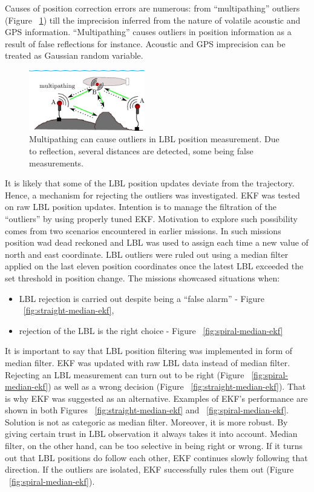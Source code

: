 Causes of position correction errors are numerous: from ``multipathing'' outliers (Figure ~\ref{fig:multipathing}) till the imprecision inferred from the nature of volatile acoustic and GPS information. ``Multipathing'' causes outliers in position information as a result of false reflections for instance. Acoustic and GPS imprecision can be treated as Gaussian random variable. 
\begin{figure}
\vspace{-10pt}
  \centering
    \includegraphics[width=0.45\textwidth]{results/fig/multipathing.eps}
  \caption{Multipathing can cause outliers in LBL position measurement. Due to reflection, several distances are detected, some  being false measurements.}
\label{fig:multipathing}
\end{figure}
It is likely that some of the LBL position updates deviate from the trajectory. Hence, a mechanism for rejecting the outliers was investigated. EKF was tested on raw LBL position updates. Intention is to manage the filtration of the ``outliers'' by using properly tuned EKF. Motivation to explore such possibility comes from two scenarios encountered in earlier missions. In such missions position wad dead reckoned and LBL was used to assign each time a new value of north and east coordinate. LBL outliers were ruled out using a median filter applied on the last eleven position coordinates once the latest LBL exceeded the set threshold in position change. The missions showcased situations when: 
\begin{itemize}
\item LBL rejection is carried out despite being a ``false alarm'' - Figure ~\ref{fig:straight-median-ekf},
\item rejection of the LBL is the right choice - Figure ~\ref{fig:spiral-median-ekf}
\end{itemize}
It is important to say that LBL position filtering was implemented in form of median filter. EKF was updated with raw LBL data instead of median filter. Rejecting an LBL measurement can turn out to be right (Figure ~\ref{fig:spiral-median-ekf}) as well as a wrong decision (Figure ~\ref{fig:straight-median-ekf}). That is why EKF was suggested as an alternative. Examples of EKF's performance are shown in both Figures ~\ref{fig:straight-median-ekf} and ~\ref{fig:spiral-median-ekf}. Solution is not as categoric as median filter. Moreover, it is more robust. By giving certain trust in LBL observation it always takes it into account. Median filter, on the other hand, can be too selective in being right or wrong. If it turns out that LBL positions do follow each other, EKF continues slowly following that direction. If the outliers are isolated, EKF successfully rules them out (Figure ~\ref{fig:spiral-median-ekf}). 
